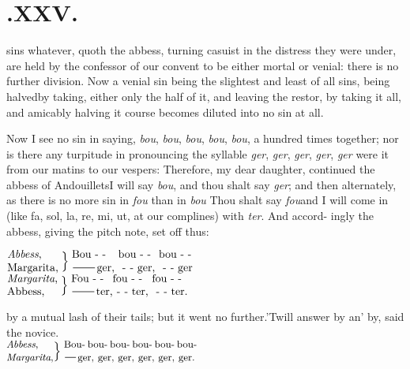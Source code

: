 \documentclass{article}
\begin{document}
\section{.\enspace XXV.}

 sins whatever, quoth the abbess,
turning casuist in the distress they were under, are held by the
confessor of our convent to be either mortal or venial:\break
there is no further division. Now a venial sin being the
slightest and least of all sins,\break
\tsk being halved\tsk by taking, either only the half of it, and
leaving the rest\tsk or, by taking it all, and amicably halving
it  course becomes
diluted into no sin at all.

\bigskip
{}\eject

Now I see no sin in saying, \textit{bou}, \textit{bou}, \textit{bou}, \textit{bou},
\textit{bou}, a hundred times together; nor is there any turpitude in pronouncing
the syllable \textit{ger}, \textit{ger}, \textit{ger}, \textit{ger}, \textit{ger}
were it from our matins to our vespers: Therefore, my dear daughter, continued the
abbess of Andouillets\tsk I will say \textit{bou}, and thou shalt say \textit{ger};
and then alternately, as there is no more sin in \textit{fou}
than in \textit{bou}\tsk
Thou shalt say \textit{fou}\tsk and I will come in (like fa,
sol, la, re, mi, ut, at\break
our complines) with \textit{ter}. And accord-\break
ingly the abbess, giving the pitch note,
set off thus:

\noindent$
\vcenter{\halign{#\hss\cr
\textit{Abbess},\cr 
Margarita,\cr}}\;\Big\}\;
\vcenter{\halign{&#\hss\cr
Bou - - &bou - - &bou - -\cr
\tsh ger, &\hbox to 14pt{ - -} ger, &\hbox to 14pt{ - -} ger\cr}}
$\\[4pt]
$
\vcenter{\halign{#\hss\cr
\textit{Margarita},\cr 
Abbess,\cr}}\;\Big\}\;
\vcenter{\halign{&#\hss\cr
Fou - - &fou - - &fou - -\cr
\tsh ter,&\hbox to 14pt{ - -} ter, &\hbox to 14pt{ - -} ter.\cr}}
$

\smallskip
{}\eject

\break
by a mutual lash of their tails; but it\break
went no further.\tsh ’Twill answer by an’\break
by, said the novice.\\[6pt]
$
\left.\!\vcenter{\halign{\small #\hss\cr
\textit{Abbess},\cr 
\textit{Margarita},\cr}}\right\}$\,$
\vcenter{\halign{\hbox to 119pt{\small #}\cr
Bou- bou- bou- bou- bou- bou-\cr
\tsk ger, ger, ger, ger, ger, ger.\cr}}$
\end{document}
